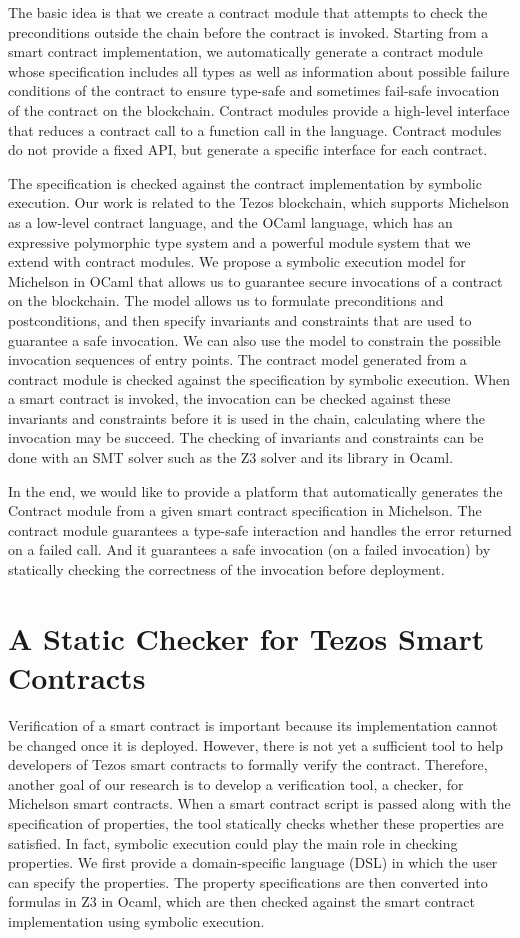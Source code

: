 \documentclass[a4paper,11pt]{article}
\begin{document}
The basic idea is that we create a contract module that attempts to check the preconditions outside the chain before the contract is invoked. Starting from a smart contract implementation, we automatically generate a contract module whose specification includes all types as well as information about possible failure conditions of the contract to ensure type-safe and sometimes fail-safe invocation of the contract on the blockchain. Contract modules provide a high-level interface that reduces a contract call to a function call in the language. Contract modules do not provide a fixed API, but generate a specific interface for each contract.

The specification is checked against the contract implementation by symbolic execution. Our work is related to the Tezos blockchain, which supports Michelson as a low-level contract language, and the OCaml language, which has an expressive polymorphic type system and a powerful module system that we extend with contract modules. We propose a symbolic execution model for Michelson in OCaml that allows us to guarantee secure invocations of a contract on the blockchain. The model allows us to formulate preconditions and postconditions, and then specify invariants and constraints that are used to guarantee a safe invocation. We can also use the model to constrain the possible invocation sequences of entry points. The contract model generated from a contract module is checked against the specification by symbolic execution. When a smart contract is invoked, the invocation can be checked against these invariants and constraints before it is used in the chain, calculating where the invocation may be succeed. The checking of invariants and constraints can be done with an SMT solver such as the Z3 solver and its library in Ocaml. 

In the end, we would like to provide a platform that automatically generates the Contract module from a given smart contract specification in Michelson. The contract module guarantees a type-safe interaction and handles the error returned on a failed call. And it guarantees a safe invocation (on a failed invocation) by statically checking the correctness of the invocation before deployment.
\section{A Static Checker for Tezos Smart Contracts}
\label{sec:static-checker}
Verification of a smart contract is important because its implementation cannot be changed once it is deployed. However, there is not yet a sufficient tool to help developers of Tezos smart contracts to formally verify the contract. Therefore, another goal of our research is to develop a verification tool, a checker, for Michelson smart contracts. When a smart contract script is passed along with the specification of properties, the tool statically checks whether these properties are satisfied. In fact, symbolic execution could play the main role in checking properties. We first provide a domain-specific language (DSL) in which the user can specify the properties. The property specifications are then converted into formulas in Z3 in Ocaml, which are then checked against the smart contract implementation using symbolic execution.
\end{document}
